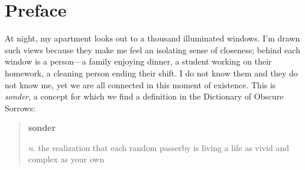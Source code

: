\iffalse
\section*{Preface}

The sun has set over the Olympics on what is undoubtedly one of the last clear days of the year.
Seattle is beautiful in the summer, but I've always preferred the rain -- the persistent grey sidesteps the feeling of dissonance that accompanies sunny weather.
It is only fitting, then, that this document, which is the culmination of my time here, will be written over the long nights of a Pacific northwest winter.  

\vspace{.5em}
October 30, 2021
\vspace{-.7em}

Chinatown/International District
\vspace{-.7em}

Seattle, Washington

\begin{verse}
\textbf{Promise}

Long nights, short years. Forgiving
\\
silence.

When morning comes, and pain --

no one is a stranger, this whole world is your home. 
\end{verse}
\fi



\section*{Preface}

At night, my apartment looks out to a thousand illuminated windows.
I'm drawn such views because they make me feel an isolating sense of closeness; behind each window is a person---a family enjoying dinner, a student working on their homework, a cleaning person ending their shift.
I do not know them and they do not know me, yet we are all connected in this moment of existence. 
This is \emph{sonder}, a concept for which we find a definition in the Dictionary of Obscure Sorrows:
\begin{quote}
\textbf{sonder}

{\textit n.} the realization that each random passerby is living a life as vivid and complex as your own%
\end{quote}

